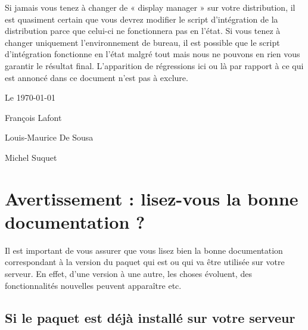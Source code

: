 \documentclass[french,a4paper,12pt]{article}
\begin{document}
\begin{center}
\begin{minipage}{0.8\linewidth}
Si jamais vous tenez à changer de « display manager » sur votre distribution,
il est quasiment certain que vous devrez modifier le script d'intégration
de la distribution parce que celui-ci ne fonctionnera pas en l'état.
Si vous tenez à changer uniquement l'environnement de bureau, il est
possible que le script d'intégration fonctionne en l'état malgré tout
mais nous ne pouvons en rien vous garantir le résultat
final. L'apparition de régressions ici ou là par rapport à ce qui
est annoncé dans ce document n'est pas à exclure.
\bigskip

\hspace{2em}Le \today\par
\hspace{2em}François Lafont\par
\hspace{2em}Louis-Maurice De Sousa\par
\hspace{2em}Michel Suquet\par

\end{minipage}
\end{center}


\vspace{\fill}

\newpage


\tableofcontents%

\listoftables%

\newpage


\section{Avertissement : lisez-vous la bonne documentation ?}

\begin{alerte}
Il est important de vous assurer que vous lisez bien la bonne documentation
correspondant à la version du paquet  
qui est ou qui va être utilisée sur votre serveur. En effet, d'une
version à une autre, les choses évoluent, des fonctionnalités nouvelles peuvent
apparaître etc.
\end{alerte}


\subsection{Si le paquet est déjà installé sur votre serveur}
\end{document}
